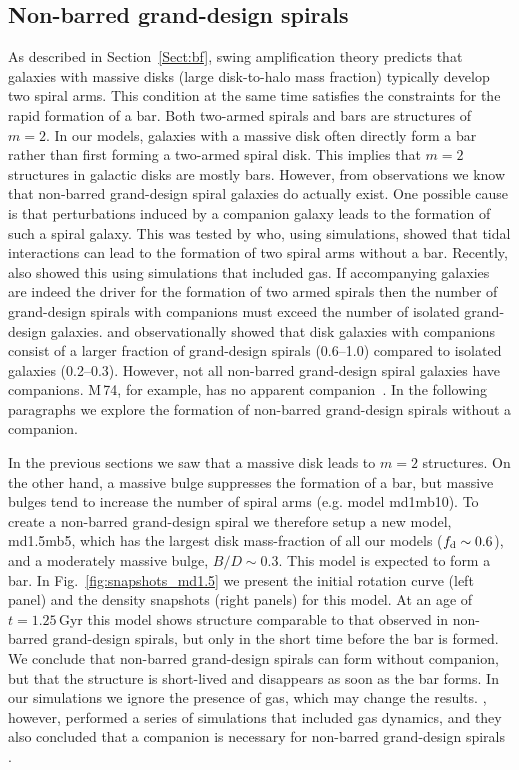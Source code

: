 \subsection{Non-barred grand-design spirals}

As described in Section~\ref{Sect:bf}, swing amplification theory 
predicts that galaxies with massive disks (large disk-to-halo 
mass fraction) typically develop two spiral arms. This condition at the
same time satisfies the constraints for the rapid formation of a bar.
Both two-armed spirals and bars are structures of $m=2$.
In our models, galaxies with a massive disk often directly
form a bar rather than first forming a two-armed spiral disk. This implies
that $m=2$ structures in galactic disks are mostly bars. 
However, from observations we know that non-barred grand-design spiral
galaxies do actually exist.
One possible cause is that perturbations induced by a companion galaxy leads to 
the formation of such a spiral galaxy. This was tested by \citet{1972ApJ...178..623T} 
who, using simulations, showed that tidal interactions can lead to the 
formation of two spiral arms without a bar. Recently, \citet{2018MNRAS.474.5645P}
also showed this using simulations that included gas.
If accompanying galaxies are indeed the 
driver for the formation of two armed spirals then the 
number of grand-design spirals with companions must exceed the number of 
isolated grand-design galaxies. 
\citet{1979ApJ...233..539K} and \citet{1982MNRAS.201.1021E} observationally 
showed that disk galaxies with companions consist of a larger fraction of grand-design
spirals (0.6--1.0) compared to isolated galaxies (0.2--0.3).
However, not all non-barred grand-design spiral galaxies have companions. 
M\,74, for example, has no apparent companion~\citep{2011MNRAS.414..538K}.
In the following paragraphs we explore the formation of non-barred grand-design 
spirals without a companion. 

In the previous sections we saw that a massive disk leads to $m=2$ structures.
On the other hand, a massive bulge suppresses the formation of a bar, but massive bulges
tend to increase the number of spiral arms (e.g. model md1mb10).
To create a non-barred grand-design spiral we therefore setup a new model, md1.5mb5, which 
has the largest disk mass-fraction of all our models ($f_{\rm d}\sim 0.6$),  and a 
moderately massive bulge, $B/D\sim 0.3$. This model is expected to form a bar.
In Fig.~\ref{fig:snapshots_md1.5} we present the initial rotation curve (left panel) and the
density snapshots (right panels) for this model. 
At an age of $t=1.25$\,Gyr this model shows structure comparable to that observed in non-barred grand-design spirals, 
but only in the short time before the bar is formed. 
We conclude that non-barred grand-design spirals can form without companion, but that the structure is short-lived and disappears as soon as the bar forms. 
In our simulations we ignore the presence of gas, which may change the results.
\citet{2003MNRAS.344..358B}, however, performed a series of simulations 
that included gas dynamics, and they also concluded that a companion is necessary for non-barred grand-design spirals
\citep[see also a review by ][]{2014PASA...31...35D}.

